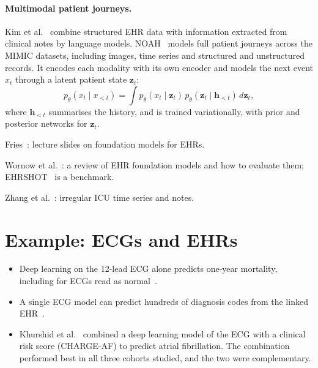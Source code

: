 \paragraph{Multimodal patient journeys.} Kim et al.~\cite{kim2026computable}
combine structured EHR data with information extracted from clinical notes by
language models. NOAH~\cite{susetzky2026noah} models full patient journeys across
the MIMIC datasets, including images, time series and structured and
unstructured records. It encodes each modality with its own encoder and models
the next event $x_t$ through a latent patient state $\mathbf{z}_t$:
\begin{equation}
  p_\theta(x_t \mid x_{<t}) = \int p_\theta(x_t \mid \mathbf{z}_t)\, p_\theta(\mathbf{z}_t \mid \mathbf{h}_{<t})\, d\mathbf{z}_t,
\end{equation}
where $\mathbf{h}_{<t}$ summarises the history, and is trained variationally,
with prior and posterior networks for $\mathbf{z}_t$.

\begin{furtherreading}
  \item Fries~\cite{fries2025foundation}: lecture slides on foundation models for EHRs.
  \item Wornow et al.~\cite{wornow2023shaky}: a review of EHR foundation models and
        how to evaluate them; EHRSHOT~\cite{wornow2023ehrshot} is a benchmark.
  \item Zhang et al.~\cite{zhang2023improving}: irregular ICU time series and notes.
\end{furtherreading}


\section{Example: ECGs and EHRs}
\label{sec:ecg_ehr}

\begin{itemize}
  \item Deep learning on the 12-lead ECG alone predicts one-year mortality, including
        for ECGs read as normal~\cite{raghunath2020prediction}.
  \item A single ECG model can predict hundreds of diagnosis codes from the linked
        EHR~\cite{strodthoff2024prospects}.
  \item Khurshid et al.~\cite{khurshid2022ecg} combined a deep learning model of the
        ECG with a clinical risk score (CHARGE-AF) to predict atrial fibrillation.
        The combination performed best in all three cohorts studied, and the two
        were complementary.
\end{itemize}

